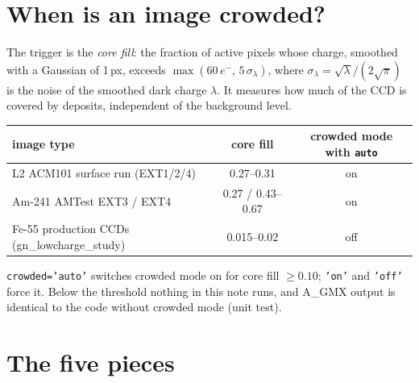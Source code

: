 \documentclass[11pt,a4paper]{article}
\newcommand{\el}{\ensuremath{e^-}}
\newcommand{\AGMX}{A\_GMX}
\newcommand{\code}[1]{\texttt{#1}}
\begin{document}
\section{When is an image crowded?}\label{sec:trigger}
The trigger is the \emph{core fill}: the fraction of active pixels whose charge, smoothed with a Gaussian of 1\,px, exceeds
$\max(60\,\el,\,5\,\sigma_\lambda)$, where $\sigma_\lambda=\sqrt{\lambda}/(2\sqrt\pi)$ is the noise of the smoothed dark
charge $\lambda$. It measures how much of the CCD is covered by deposits, independent of the background level.
\begin{center}\small
\begin{tabular}{lcc}
\toprule
image type & core fill & crowded mode with \code{auto} \\ \midrule
L2 ACM101 surface run (EXT1/2/4) & 0.27--0.31 & on \\
Am-241 AMTest EXT3 / EXT4 & 0.27 / 0.43--0.67 & on \\
Fe-55 production CCDs (gn\_lowcharge\_study) & 0.015--0.02 & off \\
\bottomrule
\end{tabular}
\end{center}
\code{crowded='auto'} switches crowded mode on for core fill $\ge0.10$; \code{'on'} and \code{'off'} force it. Below the
threshold nothing in this note runs, and \AGMX{} output is identical to the code without crowded mode (unit test).

\section{The five pieces}
\end{document}
